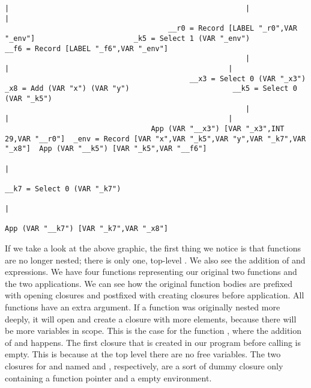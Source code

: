\begin{landscape}
\begin{lstlisting}[basicstyle=\fontsize{6.25}{7.25}\selectfont\ttfamily]
                                                        |                                                       |                                                   |
                                      __r0 = Record [LABEL "_r0",VAR "_env"]                       _k5 = Select 1 (VAR "_env")                    __f6 = Record [LABEL "_f6",VAR "_env"]
                                                        |                                                       |                                                   |
                                           __x3 = Select 0 (VAR "_x3")                            _x8 = Add (VAR "x") (VAR "y")                        __k5 = Select 0 (VAR "_k5")
                                                        |                                                       |                                                   |
                                  App (VAR "__x3") [VAR "_x3",INT 29,VAR "__r0"]  _env = Record [VAR "x",VAR "_k5",VAR "y",VAR "_k7",VAR "_x8"]  App (VAR "__k5") [VAR "_k5",VAR "__f6"]
                                                                                                                |
                                                                                                   __k7 = Select 0 (VAR "_k7")
                                                                                                                |
                                                                                              App (VAR "__k7") [VAR "_k7",VAR "_x8"]

\end{lstlisting}
If we take a look at the above graphic, the first thing we notice is that functions are no longer nested; there is only one, top-level . We also see the addition of  and  expressions. We have four functions representing our original two functions and the two applications. We can see how the original function bodies are prefixed with opening closures and postfixed with creating closures before application. All functions have an extra  argument. If a function was originally nested more deeply, it will open and create a closure with more elements, because there will be more variables in scope. This is the case for the function , where the addition of  and  happens. The first closure that is created in our program before calling  is empty. This is because at the top level there are no free variables. The two closures for  and  named  and , respectively, are a sort of dummy closure only containing a function pointer and a empty environment.
\end{landscape}
\clearpage

